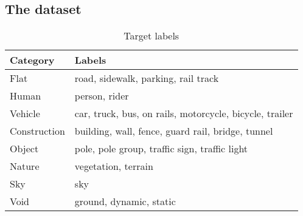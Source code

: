 \subsection{The dataset}
\label{sec:dataset}

\begin{table}
    \centering
    \caption{Target labels}
    \label{tab:labels}
    \begin{tabular}{ll}
        \hline
        Category    & Labels \\
        \hline
        Flat        & road, sidewalk, parking, rail track \\
        Human       & person, rider \\
        Vehicle     & car, truck, bus, on rails, motorcycle, bicycle, trailer \\
        Construction& building, wall, fence, guard rail, bridge, tunnel \\
        Object      & pole, pole group, traffic sign, traffic light \\
        Nature      & vegetation, terrain \\
        Sky	        & sky \\
        Void        & ground, dynamic, static \\
        \hline
    \end{tabular}
\end{table}

